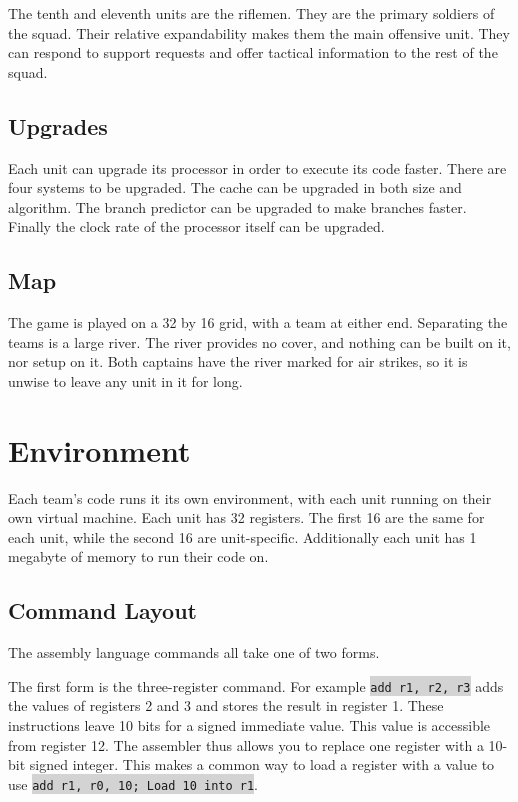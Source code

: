 \documentclass{article}
\newcommand{\vnscode}[1]{\colorbox{lightgray}{\lstinline[language=vns]{#1}}}
\begin{document}
The tenth and eleventh units are the riflemen. They are the primary soldiers of
the squad. Their relative expandability makes them the main offensive unit. They
can respond to support requests and offer tactical information to the rest of
the squad.

\subsection*{Upgrades}

Each unit can upgrade its processor in order to execute its code faster. There
are four systems to be upgraded. The cache can be upgraded in both size and
algorithm. The branch predictor can be upgraded to make branches faster. Finally
the clock rate of the processor itself can be upgraded.

\subsection*{Map}

The game is played on a 32 by 16 grid, with a team at either end. Separating the
teams is a large river. The river provides no cover, and nothing can be built on
it, nor setup on it. Both captains have the river marked for air strikes, so it
is unwise to leave any unit in it for long.

\clearpage

\section*{Environment}

Each team's code runs it its own environment, with each unit running on their
own virtual machine. Each unit has 32 registers. The first 16 are the same for
each unit, while the second 16 are unit-specific. Additionally each unit has 1
megabyte of memory to run their code on.

\subsection*{Command Layout}

The assembly language commands all take one of two forms.

The first form is the three-register command. For example \vnscode{add r1, r2,
r3} adds the values of registers 2 and 3 and stores the result in register 1.
These instructions leave 10 bits for a signed immediate value. This value is
accessible from register 12.  The assembler thus allows you to replace one
register with a 10-bit signed integer. This makes a common way to load a
register with a value to use \vnscode{add r1, r0, 10; Load 10 into r1}.
\end{document}
